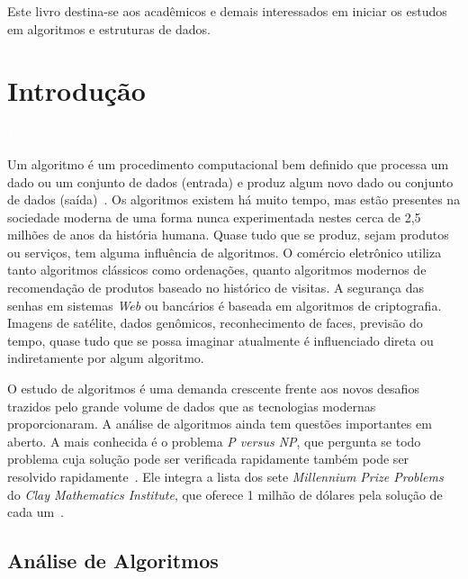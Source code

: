 \documentclass[11pt,fleqn]{book} %
\begin{document}

Este livro destina-se aos acadêmicos e demais interessados em iniciar os estudos em algoritmos e estruturas de dados.

\chapter{Introdução}\label{introducao}
\vspace{6em}
\begin{flushright}
	\textit{\textcolor{white}{Um bonita citação...}}
\end{flushright}
\vspace{12em}

Um algoritmo é um procedimento computacional bem definido que processa um dado ou um conjunto de dados (entrada) e produz algum novo dado ou conjunto de dados (saída)~\cite{cormen2009}.
Os algoritmos existem há muito tempo, mas estão presentes na sociedade moderna de uma forma nunca experimentada nestes cerca de 2,5 milhões de anos da história humana.
Quase tudo que se produz, sejam produtos ou serviços, tem alguma influência de algoritmos.
O comércio eletrônico utiliza tanto algoritmos clássicos como ordenações, quanto algoritmos modernos de recomendação de produtos baseado no histórico de visitas.
A segurança das senhas em sistemas \textit{Web} ou bancários é baseada em algoritmos de criptografia.
Imagens de satélite, dados genômicos, reconhecimento de faces, previsão do tempo, quase tudo que se possa imaginar atualmente é influenciado direta ou indiretamente por algum algoritmo.

O estudo de algoritmos é uma demanda crescente frente aos novos desafios trazidos pelo grande volume de dados que as tecnologias modernas proporcionaram.
A análise de algoritmos ainda tem questões importantes em aberto.
A mais conhecida é o problema \textit{P versus NP}, que pergunta se todo problema cuja solução pode ser verificada rapidamente também pode ser resolvido rapidamente~\cite{cook1971}.
Ele integra a lista dos sete \textit{Millennium Prize Problems} do \textit{Clay Mathematics Institute}, que oferece 1 milhão de dólares pela solução de cada um~\cite{clay2000}.

\section{Análise de Algoritmos}\label{sec_analise}
\end{document}

